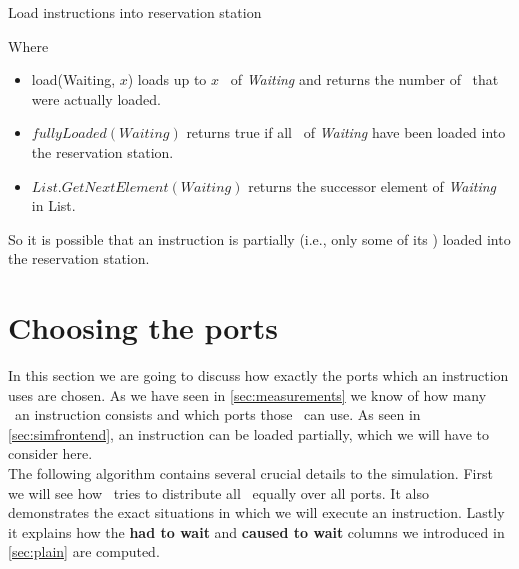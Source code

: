 \begin{algorithm}[H]
    \SetAlgoLined
    \caption{Load instructions into reservation station}
\end{algorithm}

Where
\begin{itemize}
    \item load\microops(Waiting, $x$) loads up to $x$ \microops\ of \emph{Waiting} and returns the number of \microops\ that were actually loaded.
    \item $fullyLoaded(Waiting)$ returns true if all \microops\ of \emph{Waiting} have been loaded into the reservation station.
    \item $List.GetNextElement(Waiting)$ returns the successor element of \emph{Waiting} in List.
\end{itemize}

So it is possible that an instruction is partially (i.e., only some of its \microops) loaded into the reservation station.

\section{Choosing the ports}
\label{sec:chooseport}

In this section we are going to discuss how exactly the ports which an instruction uses are chosen. As we have seen in \autoref{sec:measurements} we know of how many \microops\ an instruction consists and which ports those \microops\ can use. As seen in \autoref{sec:simfrontend}, an instruction can be loaded partially, which we will have to consider here.\\
The following algorithm contains several crucial details to the simulation. First we will see how \suaca\ tries to distribute all \microops\ equally over all ports. It also demonstrates the exact situations in which we will execute an instruction. Lastly it explains how the \textbf{had to wait} and \textbf{caused to wait} columns we introduced in \autoref{sec:plain} are computed. 
\newpage

